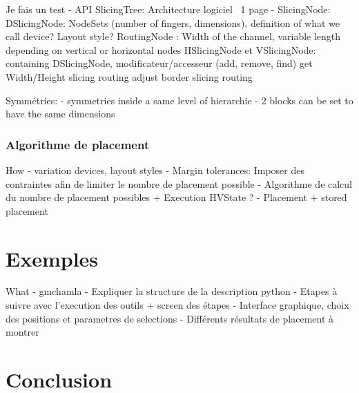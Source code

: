 Je fais un test
- API SlicingTree: Architecture logiciel ~1 page
- SlicingNode: 
DSlicingNode: NodeSets (number of fingers, dimensions), definition of what we call device? Layout style?
RoutingNode : Width of the channel, variable length depending on vertical or horizontal nodes
HSlicingNode et VSlicingNode: containing DSlicingNode, modificateur/accesseur (add, remove, find)
get Width/Height
slicing routing
adjust border slicing routing

Symmétries:
- symmetries inside a same level of hierarchie
- 2 blocks can be set to have the same dimensions

\subsubsection{Algorithme de placement}

How
- variation devices, layout styles
- Margin tolerances: Imposer des contraintes afin de limiter le nombre de placement possible
- Algorithme de calcul du nombre de placement possibles + Execution HVState ?
- Placement + stored placement

\section{Exemples}
\label{sec:Placement-Exemple}
What
- gmchamla
- Expliquer la structure de la description python
- Etapes à suivre avec l'execution des outils + screen des étapes
- Interface graphique, choix des positions et parametres de selections
- Différents résultats de placement à montrer
\section{Conclusion}